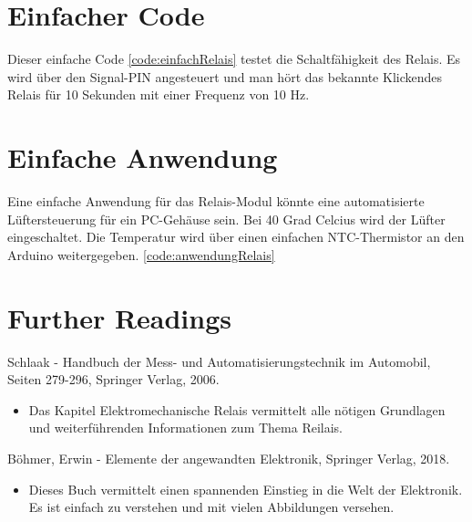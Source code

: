 \section{Einfacher Code}
Dieser einfache Code \ref{code:einfachRelais} testet die Schaltfähigkeit des Relais. Es wird über den Signal-PIN angesteuert und man hört das bekannte \glqq Klicken\grqq des Relais für 10 Sekunden mit einer Frequenz von 10 Hz.

\begin{code}[H]
	\caption{Code zur Überprüfung der Funktionalität}
	\label{code:einfachRelais}
\end{code}

\section{Einfache Anwendung}
Eine einfache Anwendung für das Relais-Modul könnte eine automatisierte Lüftersteuerung für ein PC-Gehäuse sein. Bei 40 Grad Celcius wird der Lüfter eingeschaltet. Die Temperatur wird über einen einfachen NTC-Thermistor an den Arduino weitergegeben. \ref{code:anwendungRelais}

\begin{code}[H]
	\caption{Einfache Anwendung mit dem Relais}
	\label{code:anwendungRelais}
\end{code}

\section{Further Readings}
Schlaak - Handbuch der Mess- und Automatisierungstechnik im Automobil, Seiten 279-296, Springer Verlag, 2006. \cite{Schlaak:2006}
\begin{itemize}
	\item Das Kapitel Elektromechanische Relais vermittelt alle nötigen Grundlagen und weiterführenden Informationen zum Thema Reilais.
\end{itemize}

Böhmer, Erwin - Elemente der angewandten Elektronik, Springer Verlag, 2018. \cite{Bohmer:2018}
\begin{itemize}
	\item Dieses Buch vermittelt einen spannenden Einstieg in die Welt der Elektronik. Es ist einfach zu verstehen und mit vielen Abbildungen versehen.
\end{itemize}